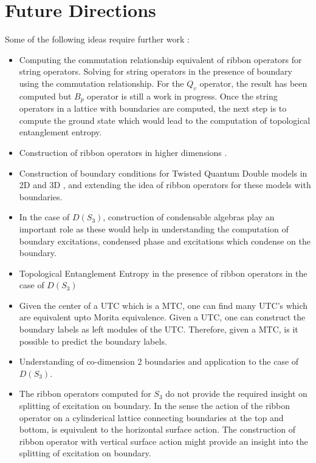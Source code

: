 \section{Future Directions}
      Some of the following ideas require further work :
\begin{itemize}
 \item Computing the commutation relationship equivalent of ribbon operators for string operators. Solving for string operators in the presence of boundary using the commutation relationship. For the 
       $Q_{v}$ operator, the result has been computed but $B_{p}$ operator is still a work in progress. Once the string operators in a lattice with boundaries are computed, the next step is to compute
       the ground state which would lead to the computation of topological entanglement entropy.
 \item Construction of ribbon operators in higher dimensions \citep{Reference10}.
 \item Construction of boundary conditions for Twisted Quantum Double models in 2D \citep{Reference11, Reference12} and 3D \citep{Reference13}, and extending the idea of ribbon operators for these models with boundaries.
 \item In the case of $D(S_{3})$, construction of condensable algebras play an important role as these would help in understanding the computation of boundary excitations, condensed phase and excitations which condense
       on the boundary.
 \item Topological Entanglement Entropy in the presence of ribbon operators in the case of $D(S_{3})$
 \item Given the center of a UTC which is a MTC, one can find many UTC's which are equivalent upto Morita equivalence. Given a UTC, one can construct the boundary labels as left modules of the UTC. Therefore, 
       given a MTC, is it possible to predict the boundary labels.
 \item Understanding of co-dimension 2 boundaries and application to the case of $D(S_{3})$.
 \item The ribbon operators computed for $S_{3}$ do not provide the required insight on splitting of excitation on boundary. In the sense the action of the ribbon operator on a cylinderical lattice 
       connecting boundaries at the top and bottom, is equivalent to the horizontal surface action. The construction of ribbon operator with vertical surface action might provide an insight into the 
       splitting of excitation on boundary.
 
\end{itemize}
